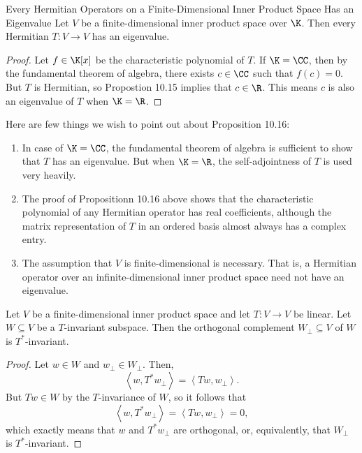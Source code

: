 \documentclass[linearalgebra]{subfiles}
\begin{document}
    \begin{prop}{Every Hermitian Operators on a Finite-Dimensional Inner Product Space Has an Eigenvalue}
        Let $V$ be a finite-dimensional inner product space over $\K$. Then every Hermitian $T:V\to V$ has an eigenvalue.
    \end{prop}

    \begin{proof}
        Let $f\in\K[x]$ be the characteristic polynomial of $T$. If $\K=\CC$, then by the fundamental theorem of algebra, there exists $c\in\CC$ such that $f(c)=0$. But $T$ is Hermitian, so Propostion 10.15 implies that $c\in\R$. This means $c$ is also an eigenvalue of $T$ when $\K=\R$.
    \end{proof}

    \begin{remark}
        Here are few things we wish to point out about Proposition 10.16:
        \begin{enumerate}
            \item In case of $\K=\CC$, the fundamental theorem of algebra is sufficient to show that $T$ has an eigenvalue. But when $\K=\R$, the self-adjointness of $T$ is used very heavily.
            \item The proof of Propositionn 10.16 above shows that the characteristic polynomial of any Hermitian operator has real coefficients, although the matrix representation of $T$ in an ordered basis almost always has a complex entry.
            \item The assumption that $V$ is finite-dimensional is necessary. That is, a Hermitian operator over an infinite-dimensional inner product space need not have an eigenvalue.
        \end{enumerate}
    \end{remark}

    \begin{prop}{}
        Let $V$ be a finite-dimensional inner product space and let $T:V\to V$ be linear. Let $W\subseteq V$ be a $T$-invariant subspace. Then the orthogonal complement $W_\perp\subseteq V$ of $W$ is $T^*$-invariant.
    \end{prop}

    \begin{proof}
        Let $w\in W$ and $w_\perp\in W_\perp$. Then,
        \begin{equation*}
            \left\langle w, T^*w_\perp\right\rangle = \left\langle Tw, w_\perp\right\rangle .
        \end{equation*}
        But $Tw\in W$ by the $T$-invariance of $W$, so it follows that
        \begin{equation*}
            \left\langle w, T^*w_\perp\right\rangle = \left\langle Tw, w_\perp\right\rangle = 0,
        \end{equation*}
        which exactly means that $w$ and $T^*w_\perp$ are orthogonal, or, equivalently, that $W_\perp$ is $T^*$-invariant.
    \end{proof}
\end{document}
